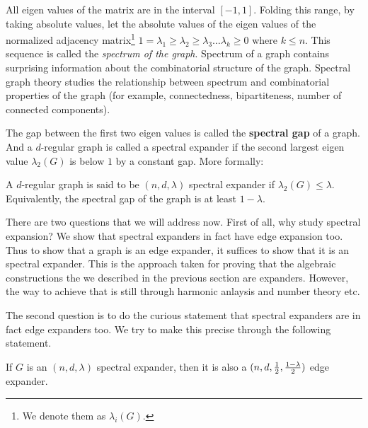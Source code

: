 All eigen values of the matrix are in the interval $[-1,1]$. Folding this range, by taking absolute values, 
let the absolute values of the eigen values of the normalized adjacency matrix\footnote{We denote them as $\lambda_i(G)$.} $1=\lambda_1 \ge \lambda_2 \ge \lambda_3 \ldots \lambda_k \ge 0$ where $k \le n$. This sequence is called the {\em spectrum of the graph}. Spectrum of a graph contains surprising information about the combinatorial structure of the graph. Spectral graph theory studies the relationship between spectrum and combinatorial properties of the graph (for example, connectedness, bipartiteness, number of connected components).

The gap between the first two eigen values is called the \textbf{spectral gap} of a graph. And a $d$-regular graph is called a spectral expander if the second largest eigen value $\lambda_2(G)$ is below $1$ by a constant gap. More formally:

\begin{definition}
A $d$-regular graph is said to be $(n,d,\lambda)$ spectral expander if $\lambda_2(G) \le \lambda$. Equivalently, the spectral gap of the graph is at least $1-\lambda$.
\end{definition}

There are two questions that we will address now. First of all, why study spectral expansion? We show that spectral expanders in fact have edge expansion too. Thus to show that a graph is an edge expander, it suffices to show that it is an spectral expander. This is the approach taken for proving that the algebraic constructions the we described in the previous section are expanders. However, the way to achieve that is still through harmonic anlaysis and number theory etc.

The second question is to do the curious statement that spectral expanders are in fact edge expanders too. We try to make this precise through the following statement.

\begin{theorem}
If $G$ is an $(n,d,\lambda)$ spectral expander, then it is also a $(n,d,\frac{1}{2},\frac{1-\lambda}{2})$ edge expander.
\end{theorem}
